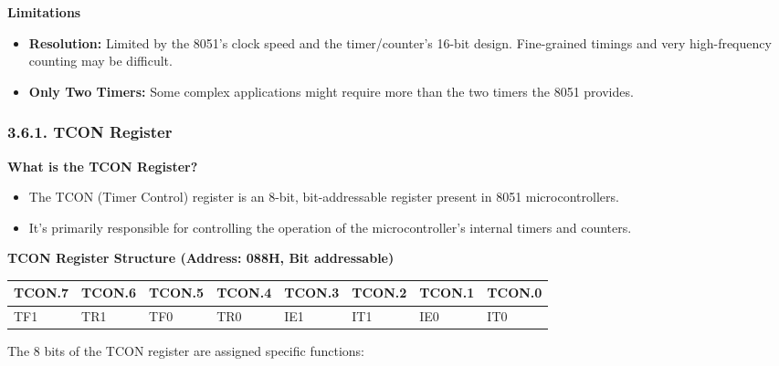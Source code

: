 \documentclass[
]{article}
\begin{document}
\textbf{Limitations}

\begin{itemize}
\item
  \textbf{Resolution:} Limited by the 8051's clock speed and the
  timer/counter's 16-bit design. Fine-grained timings and very
  high-frequency counting may be difficult.
\item
  \textbf{Only Two Timers:} Some complex applications might require more
  than the two timers the 8051 provides.
\end{itemize}

\hypertarget{361-tcon-register}{%
\subsubsection{3.6.1. TCON Register}\label{361-tcon-register}}

\textbf{What is the TCON Register?}

\begin{itemize}
\item
  The TCON (Timer Control) register is an 8-bit, bit-addressable
  register present in 8051 microcontrollers.
\item
  It's primarily responsible for controlling the operation of the
  microcontroller's internal timers and counters.
\end{itemize}

\textbf{TCON Register Structure (Address: 088H, Bit addressable)}

\begin{longtable}[]{@{}llllllll@{}}
\toprule
TCON.7 & TCON.6 & TCON.5 & TCON.4 & TCON.3 & TCON.2 & TCON.1 & TCON.0 \\
\midrule
\endhead
TF1 & TR1 & TF0 & TR0 & IE1 & IT1 & IE0 & IT0 \\
\bottomrule
\end{longtable}

The 8 bits of the TCON register are assigned specific functions:
\end{document}
